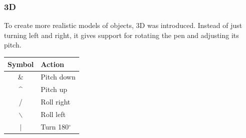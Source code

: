 \documentclass[11pt,a4paper]{article}
\newcommand{\degree}{\ensuremath{^\circ}}
\begin{document}
\subsubsection{3D}
To create more realistic models of objects, 3D was introduced. Instead of just turning left and right, it gives support for rotating the pen and adjusting its pitch.

\begin{center}
\begin{tabular}{c | l}
Symbol & Action \\ \hline
\& & Pitch down \\
\^{} & Pitch up \\
/ & Roll right \\
$\backslash$ & Roll left \\
$\vert$  & Turn 180\degree \\
\end{tabular}
\end{center}
\end{document}
